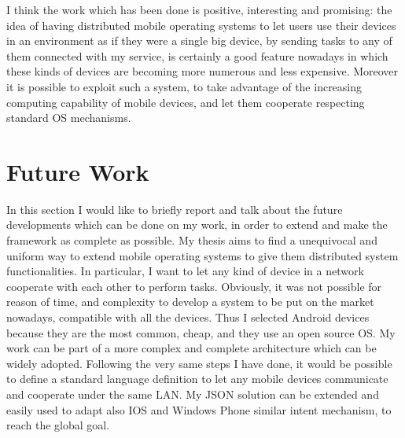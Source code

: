 I think the work which has been done is positive, interesting and promising: the
idea of having distributed mobile operating systems to let users use their devices in an environment as if they were a single big device, by sending tasks to any of them connected with my service, is certainly a good feature nowadays in which these kinds of devices are becoming more numerous and less expensive. Moreover it is possible to exploit such a system, to take advantage of the increasing computing capability of mobile devices, and let them cooperate respecting standard OS mechanisms.
\section{Future Work} 
In this section I would like to briefly report and talk about the future developments which can be done on my work, in order to extend and make the framework as complete as possible.
My thesis aims to find a unequivocal and uniform way to extend mobile operating systems to give them distributed system functionalities. In particular, I want to let any kind of device in a network cooperate with each other to perform tasks. Obviously, it was not possible for
reason of time, and complexity to develop a system to be put on the market nowadays, compatible with all the devices. Thus I selected Android devices because they are the most common, cheap, and they use an open source OS. My work can be part of a more complex and complete architecture which can be widely adopted. Following the  very same steps I have done, it would be possible to define a standard language definition to let any mobile devices communicate and cooperate under the same LAN. My JSON solution can be extended and easily used to adapt also IOS and Windows Phone similar intent mechanism, to reach the global goal.



%
